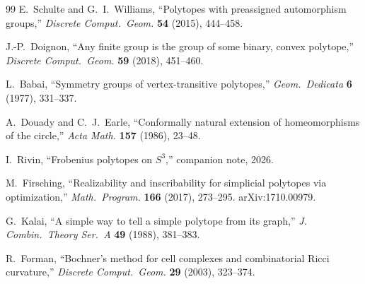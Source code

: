 \documentclass[11pt]{article}
\begin{document}
\begin{thebibliography}{99}
E.~Schulte and G.~I.~Williams, ``Polytopes with preassigned automorphism groups,'' \emph{Discrete Comput.\ Geom.} \textbf{54} (2015), 444--458.

J.-P.~Doignon, ``Any finite group is the group of some binary, convex polytope,'' \emph{Discrete Comput.\ Geom.} \textbf{59} (2018), 451--460.

L.~Babai, ``Symmetry groups of vertex-transitive polytopes,'' \emph{Geom.\ Dedicata} \textbf{6} (1977), 331--337.

A.~Douady and C.~J.~Earle, ``Conformally natural extension of homeomorphisms of the circle,'' \emph{Acta Math.} \textbf{157} (1986), 23--48.

I.~Rivin, ``Frobenius polytopes on $S^3$,'' companion note, 2026.

M.~Firsching, ``Realizability and inscribability for simplicial polytopes via optimization,'' \emph{Math.\ Program.} \textbf{166} (2017), 273--295. arXiv:1710.00979.

G.~Kalai, ``A simple way to tell a simple polytope from its graph,'' \emph{J. Combin.\ Theory Ser.~A} \textbf{49} (1988), 381--383.

R.~Forman, ``Bochner's method for cell complexes and combinatorial Ricci curvature,'' \emph{Discrete Comput.\ Geom.} \textbf{29} (2003), 323--374.

\end{thebibliography}
\end{document}
